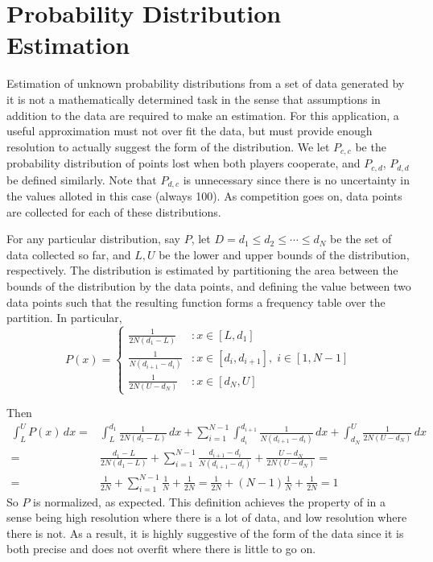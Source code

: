 \documentclass[11pt]{article}
\begin{document}
\section{Probability Distribution Estimation}

Estimation of unknown probability distributions from a set of data generated by it is not a mathematically determined task in the sense that assumptions in addition to the data are required to make an estimation. For this application, a useful approximation must not over fit the data, but must provide enough resolution to actually suggest the form of the distribution. We let $P_{c,c}$ be the probability distribution of points lost when both players cooperate, and $P_{c,d}$, $P_{d,d}$ be defined similarly. Note that $P_{d,c}$ is unnecessary since there is no uncertainty in the values alloted in this case (always 100). As competition goes on, data points are collected for each of these distributions. 

For any particular distribution, say $P$, let $D= d_1\le d_2\le \cdots \le d_N$ be the set of data collected so far, and $L, U$ be the lower and upper bounds of the distribution, respectively. The distribution is estimated by partitioning the area between the bounds of the distribution by the data points, and defining the value between two data points such that the resulting function forms a frequency table over the partition. In particular,
\[P(x)=
\begin{cases}
\frac{1}{2N(d_1-L)} &: x \in [L, d_1] \\
\frac{1}{N(d_{i+1}-d_i)} &: x \in [d_i, d_{i+1}], \;i \in [1, N-1]\\
\frac{1}{2N(U-d_N)} &: x \in [d_N, U] 
\end{cases}
\]

Then 
\begin{align*}
\int_L^U P(x)\,dx =& \int_L^{d_1} \frac{1}{2N(d_1-L)}\,dx +\sum_{i=1}^{N-1} \int_{d_i}^{d_{i+1}}\frac{1}{N(d_{i+1}-d_i)}\,dx + \int_{d_N}^U \frac{1}{2N(U-d_N)}\,dx \\
=& \frac{d_1 -L}{2N(d_1-L)} + \sum_{i=1}^{N-1}\frac{d_{i+1}-d_i}{N(d_{i+1}-d_i)} + \frac{U-d_N}{2N(U-d_N)} = \\
=& \frac{1}{2N} + \sum_{i=1}^{N-1}\frac{1}{N} + \frac{1}{2N} = \frac{1}{2N} + (N-1) \frac{1}{N} + \frac{1}{2N} = 1
\end{align*}
So $P$ is normalized, as expected. This definition achieves the property of in a sense being high resolution where there is a lot of data, and low resolution where there is not. As a result, it is highly suggestive of the form of the data since it is both precise and does not overfit where there is little to go on. 
\end{document}
